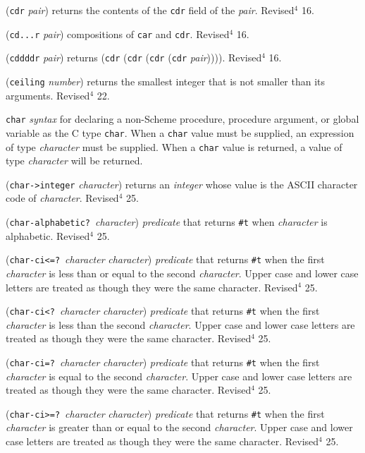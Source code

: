 \documentclass[10pt,twocolumn]{article}
\begin{document}
(\texttt{cdr} \emph{pair}) returns the contents of the \texttt{cdr} field of the
\emph{pair}.  Revised$^4$ 16.

(\texttt{cd...r} \emph{pair}) compositions of \texttt{car} and \texttt{cdr}.
Revised$^4$ 16.

(\texttt{cddddr} \emph{pair}) returns (\texttt{cdr} (\texttt{cdr} (\texttt{cdr} (\texttt{cdr} \emph{pair})))).
Revised$^4$ 16.

(\texttt{ceiling} \emph{number}) returns the smallest integer that is not
smaller than its arguments.  Revised$^4$ 22.

\texttt{char} \emph{syntax} for declaring a non-Scheme procedure, procedure
argument, or global variable as the C type \texttt{char}.  When a \texttt{char}
value must be supplied, an expression of type \emph{character} must be
supplied.  When a \texttt{char} value is returned, a value of type
\emph{character} will be returned.

(\texttt{char->integer} \emph{character}) returns an \emph{integer} whose value
is the ASCII character code of \emph{character}.  Revised$^4$ 25.

(\texttt{char-alphabetic?}\ \emph{character}) \emph{predicate} that
returns \texttt{\#t} when \emph{character} is alphabetic.  Revised$^4$ 25.

(\texttt{char-ci<=?}\ \emph{character} \emph{character}) \emph{predicate} that
returns \texttt{\#t} when the first \emph{character} is less than or equal to
the second \emph{character}.  Upper case and lower case letters are
treated as though they were the same character.  Revised$^4$ 25.

(\texttt{char-ci<?}\ \emph{character} \emph{character}) \emph{predicate} that
returns \texttt{\#t} when the first \emph{character} is less than the second
\emph{character}.  Upper case and lower case letters are treated
as though they were the same character. Revised$^4$ 25.

(\texttt{char-ci=?}\ \emph{character} \emph{character}) \emph{predicate} that
returns \texttt{\#t} when the first \emph{character} is equal to the
second \emph{character}. Upper case and lower case letters are
treated as though they were the same character.  Revised$^4$ 25.

(\texttt{char-ci>=?}\ \emph{character} \emph{character}) \emph{predicate} that
returns \texttt{\#t} when the first \emph{character} is greater than or equal
to the second \emph{character}. Upper case and lower case letters are
treated as though they were the same character. Revised$^4$ 25.
\end{document}
